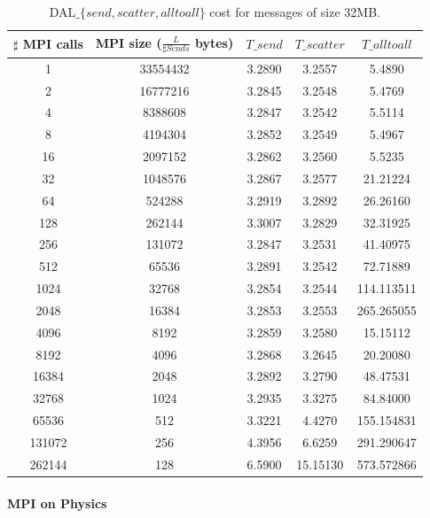 \begin{table}[h]
\begin{center}
\begin{tabular}{|c|c|c|c|c|}\hline
\hline
$\sharp$ MPI calls          & MPI size ($\frac{L}{\sharp Sends}$ bytes)          & $T\_send$   & $T\_scatter$  & $T\_alltoall$      \\\hline\hline
1 & 33554432 & 3.2890 & 3.2557 & 5.4890 \\\hline
2 & 16777216 & 3.2845 & 3.2548 & 5.4769 \\\hline
4 & 8388608 & 3.2847 & 3.2542 & 5.5114 \\\hline
8 & 4194304 & 3.2852 & 3.2549 & 5.4967 \\\hline
16 & 2097152 & 3.2862 & 3.2560 & 5.5235 \\\hline
32 & 1048576 & 3.2867 & 3.2577 & 21.21224 \\\hline
64 & 524288 & 3.2919 & 3.2892 & 26.26160 \\\hline
128 & 262144 & 3.3007 & 3.2829 & 32.31925 \\\hline
256 & 131072 & 3.2847 & 3.2531 & 41.40975 \\\hline
512 & 65536 & 3.2891 & 3.2542 & 72.71889 \\\hline
1024 & 32768 & 3.2854 & 3.2544 & 114.113511 \\\hline
2048 & 16384 & 3.2853 & 3.2553 & 265.265055 \\\hline
4096 & 8192 & 3.2859 & 3.2580 & 15.15112 \\\hline
8192 & 4096 & 3.2868 & 3.2645 & 20.20080 \\\hline
16384 & 2048 & 3.2892 & 3.2790 & 48.47531 \\\hline
32768 & 1024 & 3.2935 & 3.3275 & 84.84000 \\\hline
65536 & 512 & 3.3221 & 4.4270 & 155.154831 \\\hline
131072 & 256 & 4.3956 & 6.6259 & 291.290647 \\\hline
262144 & 128 & 6.5900 & 15.15130 & 573.572866 \\\hline
\end{tabular}
\caption{DAL$\_\lbrace send, scatter, alltoall \rbrace$ cost for messages of size 32MB. }
\label{tsetup-impact}
\end{center}
\end{table}


\paragraph{MPI on Physics}

